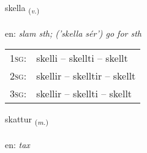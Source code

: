 \documentclass[frontgrid, backgrid]{flacards}\usepackage[]{graphicx}\usepackage[]{color}
\begin{document}
\renewcommand{\flhead}{\vskip5pt \fboxsep=0pt {\small\bfseries\footnotesize Sagnorð | Verb}}
\renewcommand{\fcfoot}{\vskip5pt \fboxsep=0pt \hspace{2pt}{\small\bfseries\footnotesize 2K}}

\renewcommand{\blhead}{\vskip5pt {\small\bfseries\footnotesize Sagnorð | Verb }}
\renewcommand{\bcfoot}{\vskip5pt \hspace{2pt}{\small\bfseries\footnotesize 2K}}


{skella \small{\textsubscript{(\textit{v.})}} \\[1ex] %
\textphonetic{[scɛtla]} \\
en: \emph{slam sth; ('skella sér') go for sth} \\  [2ex]
\renewcommand*{\arraystretch}{0.8}
\begin{tabular}{p{1cm}l}
\textsc{1sg}: & skelli -- skellti -- skellt \\ 
\textsc{2sg}: & skellir -- skelltir -- skellt \\ 
\textsc{3sg}: & skellir -- skellti -- skellt \\ 
\end{tabular}
}

\renewcommand{\flhead}{\vskip5pt \fboxsep=0pt {\small\bfseries\footnotesize Nafnorð | Noun}}
\renewcommand{\fcfoot}{\vskip5pt \fboxsep=0pt \hspace{2pt}{\small\bfseries\footnotesize 2K}}

\renewcommand{\blhead}{\vskip5pt {\small\bfseries\footnotesize Nafnorð | Noun }}
\renewcommand{\bcfoot}{\vskip5pt \hspace{2pt}{\small\bfseries\footnotesize 2K}}


{skattur \small{\textsubscript{(\textit{m.})}} \\[1ex] %
\textphonetic{[skahtʏr]} \\
en: \emph{tax} \\  [2ex]
\renewcommand*{\arraystretch}{0.8}
}
\end{document}
